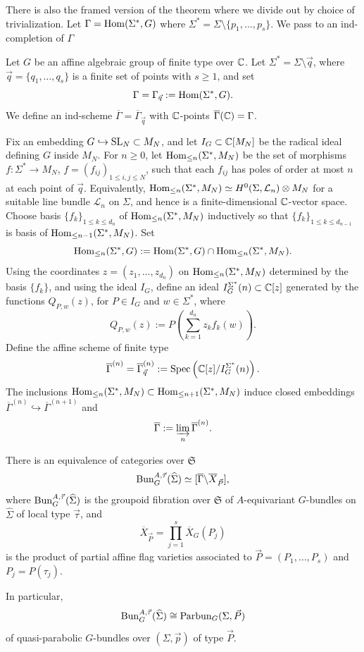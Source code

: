 \documentclass[12pt]{article}
\begin{document}
There is also the framed version of the theorem where we divide out by choice of trivialization. Let $\Gamma = \operatorname{Hom}(\Sigma^*,G)$ where $\Sigma^* = \Sigma\setminus \{p_1,\dots,p_s\}$. We pass to an ind-completion of $\Gamma$ \begin{definition}
Let \(G\) be an affine algebraic group of finite type over \(\mathbb{C}\). Let \(\Sigma^*=\Sigma\setminus \vec q\), where \(\vec q=\{q_1,\dots,q_s\}\) is a finite set of points with \(s\ge 1\), and set
\[
\Gamma=\Gamma_{\vec q}:=\operatorname{Hom}(\Sigma^*,G).
\]
We define an ind-scheme \(\overline\Gamma=\overline\Gamma_{\vec q}\) with \(\mathbb{C}\)-points \(\overline\Gamma(\mathbb{C})=\Gamma\).

Fix an embedding \(G\hookrightarrow \operatorname{SL}_N\subset M_N\), and let \(I_G\subset \mathbb{C}[M_N]\) be the radical ideal defining \(G\) inside \(M_N\). For \(n\ge 0\), let \(\operatorname{Hom}_{\le n}(\Sigma^*,M_N)\) be the set of morphisms \(f:\Sigma^*\to M_N\), \(f=(f_{ij})_{1\le i,j\le N}\), such that each \(f_{ij}\) has poles of order at most \(n\) at each point of \(\vec q\). Equivalently, \(\operatorname{Hom}_{\le n}(\Sigma^*,M_N)\simeq H^0(\Sigma,\mathcal L_n)\otimes M_N\) for a suitable line bundle \(\mathcal L_n\) on \(\Sigma\), and hence is a finite-dimensional \(\mathbb{C}\)-vector space. Choose basis \(\{f_k\}_{1\le k\le d_n}\) of \(\operatorname{Hom}_{\le n}(\Sigma^*,M_N)\) inductively so that \(\{f_k\}_{1\le k\le d_{n-1}}\) is basis of \(\operatorname{Hom}_{\le n-1}(\Sigma^*,M_N)\). Set
\[
\operatorname{Hom}_{\le n}(\Sigma^*,G):=\operatorname{Hom}(\Sigma^*,G)\cap \operatorname{Hom}_{\le n}(\Sigma^*,M_N).
\]
Using the coordinates \(z=(z_1,\dots,z_{d_n})\) on \(\operatorname{Hom}_{\le n}(\Sigma^*,M_N)\) determined by the basis \(\{f_k\}\), and using the ideal \(I_G\), define an ideal \(I_G^{\Sigma^*}(n)\subset \mathbb{C}[z]\) generated by the functions \(Q_{P,w}(z)\), for \(P\in I_G\) and \(w\in \Sigma^*\), where
\[
Q_{P,w}(z):=P\left(\sum_{k=1}^{d_n}z_k f_k(w)\right).
\]
Define the affine scheme of finite type
\[
\overline\Gamma^{(n)}
=
\overline\Gamma_{\vec q}^{(n)}
:=
\operatorname{Spec}\left(\mathbb{C}[z]/I_G^{\Sigma^*}(n)\right).
\]
The inclusions \(\operatorname{Hom}_{\le n}(\Sigma^*,M_N)\subset \operatorname{Hom}_{\le n+1}(\Sigma^*,M_N)\) induce closed embeddings
$
\overline\Gamma^{(n)}\hookrightarrow \overline\Gamma^{(n+1)}$
and 
\[
\overline\Gamma:=\varinjlim_n \overline\Gamma^{(n)}.
\]
\end{definition}
\begin{theorem}\label{thm:equivariant-uniformization-stack}
There is an equivalence of categories over \(\mathfrak S\)
\[
\operatorname{Bun}^{A,\vec\tau}_G(\widehat\Sigma)
\simeq
[\overline \Gamma\backslash \overline X_{\vec P}],
\]
where \(\operatorname{Bun}^{A,\vec\tau}_G(\widehat\Sigma)\) is the groupoid fibration over \(\mathfrak S\) of \(A\)-equivariant \(G\)-bundles on \(\widehat\Sigma\) of local type \(\vec\tau\), and
\[
\overline X_{\vec P}
=
\prod_{j=1}^s \overline X_G(P_j)
\]
is the product of partial affine flag varieties associated to $\vec P=(P_1,\dots,P_s)$ and $P_j=P(\tau_j)$.

In particular,
\[
\operatorname{Bun}^{A,\vec\tau}_G(\widehat\Sigma) \cong \operatorname{Parbun}_G(\Sigma,\vec P)\]
of quasi-parabolic \(G\)-bundles over \((\Sigma,\vec p)\) of type \(\vec P\).
\end{theorem}
\end{document}
